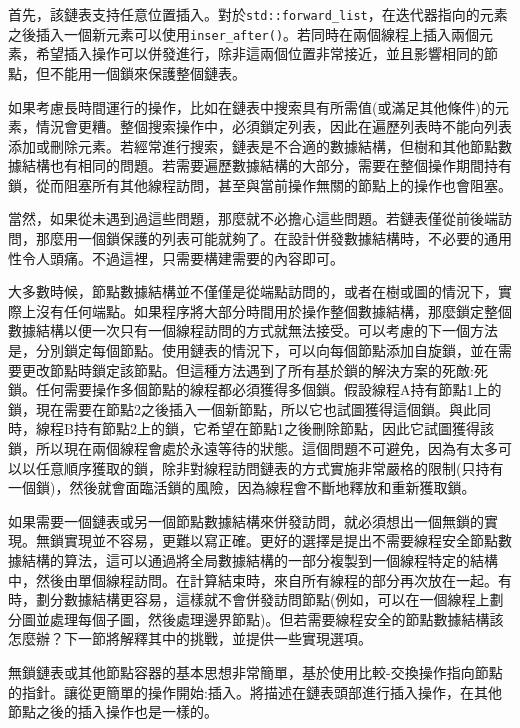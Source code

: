 首先，該鏈表支持任意位置插入。對於\texttt{std::forward\_list}，在迭代器指向的元素之後插入一個新元素可以使用\texttt{inser\_after()}。若同時在兩個線程上插入兩個元素，希望插入操作可以併發進行，除非這兩個位置非常接近，並且影響相同的節點，但不能用一個鎖來保護整個鏈表。

如果考慮長時間運行的操作，比如在鏈表中搜索具有所需值(或滿足其他條件)的元素，情況會更糟。整個搜索操作中，必須鎖定列表，因此在遍歷列表時不能向列表添加或刪除元素。若經常進行搜索，鏈表是不合適的數據結構，但樹和其他節點數據結構也有相同的問題。若需要遍歷數據結構的大部分，需要在整個操作期間持有鎖，從而阻塞所有其他線程訪問，甚至與當前操作無關的節點上的操作也會阻塞。

當然，如果從未遇到過這些問題，那麼就不必擔心這些問題。若鏈表僅從前後端訪問，那麼用一個鎖保護的列表可能就夠了。在設計併發數據結構時，不必要的通用性令人頭痛。不過這裡，只需要構建需要的內容即可。

大多數時候，節點數據結構並不僅僅是從端點訪問的，或者在樹或圖的情況下，實際上沒有任何端點。如果程序將大部分時間用於操作整個數據結構，那麼鎖定整個數據結構以便一次只有一個線程訪問的方式就無法接受。可以考慮的下一個方法是，分別鎖定每個節點。使用鏈表的情況下，可以向每個節點添加自旋鎖，並在需要更改節點時鎖定該節點。但這種方法遇到了所有基於鎖的解決方案的死敵:死鎖。任何需要操作多個節點的線程都必須獲得多個鎖。假設線程A持有節點1上的鎖，現在需要在節點2之後插入一個新節點，所以它也試圖獲得這個鎖。與此同時，線程B持有節點2上的鎖，它希望在節點1之後刪除節點，因此它試圖獲得該鎖，所以現在兩個線程會處於永遠等待的狀態。這個問題不可避免，因為有太多可以以任意順序獲取的鎖，除非對線程訪問鏈表的方式實施非常嚴格的限制(只持有一個鎖)，然後就會面臨活鎖的風險，因為線程會不斷地釋放和重新獲取鎖。

如果需要一個鏈表或另一個節點數據結構來併發訪問，就必須想出一個無鎖的實現。無鎖實現並不容易，更難以寫正確。更好的選擇是提出不需要線程安全節點數據結構的算法，這可以通過將全局數據結構的一部分複製到一個線程特定的結構中，然後由單個線程訪問。在計算結束時，來自所有線程的部分再次放在一起。有時，劃分數據結構更容易，這樣就不會併發訪問節點(例如，可以在一個線程上劃分圖並處理每個子圖，然後處理邊界節點)。但若需要線程安全的節點數據結構該怎麼辦？下一節將解釋其中的挑戰，並提供一些實現選項。


無鎖鏈表或其他節點容器的基本思想非常簡單，基於使用比較-交換操作指向節點的指針。讓從更簡單的操作開始:插入。將描述在鏈表頭部進行插入操作，在其他節點之後的插入操作也是一樣的。

